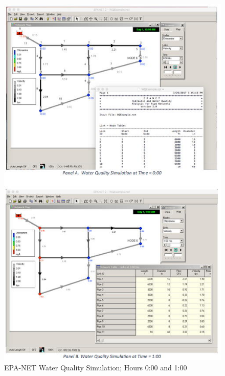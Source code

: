 \documentclass[11pt]{article}
\begin{document}
\begin{enumerate}
\begin{figure}[ht!] %
\centering
   \includegraphics[width=4.5in]{WaterQuality-1.jpg}
     \caption{EPA-NET Water Quality Simulation; Hours 0:00 and 1:00}
   \label{fig:waterQ1} 
\end{figure}


\end{enumerate}
\end{document}

